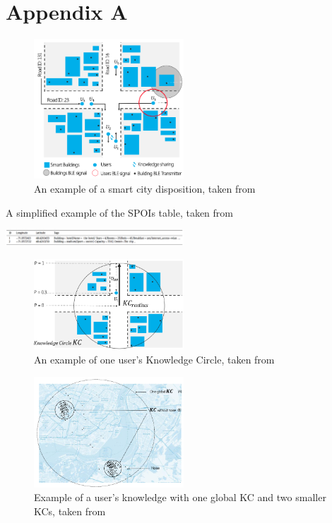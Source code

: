 \documentclass[a4paper,12pt]{article}
\begin{document}
\medskip
\newpage


\newpage
\appendix
\section*{Appendix A}
\begin{figure}[h]
\caption{An example of a smart city disposition, taken from \cite{SC}}
\label{diagram}
\centering
\includegraphics[width=0.5\textwidth]{smart_city}
\end{figure}

\begin{table}[h]
\caption{A simplified example of the SPOIs table, taken from \cite{SC}}
\label{table_1}
\centering
\includegraphics[width=0.5\textwidth]{table_1}
\end{table}

\begin{figure}[h]
\caption{An example of one user's Knowledge Circle, taken from \cite{SC}}
\label{kc}
\centering
\includegraphics[width=0.5\textwidth]{KC}
\end{figure}

\begin{figure}[h]
\caption{Example of a user's knowledge with one global KC and two smaller KCs, taken from \cite{SC}}
\label{big_kc}
\centering
\includegraphics[width=0.5\textwidth]{big_kc}
\end{figure}
\end{document}
